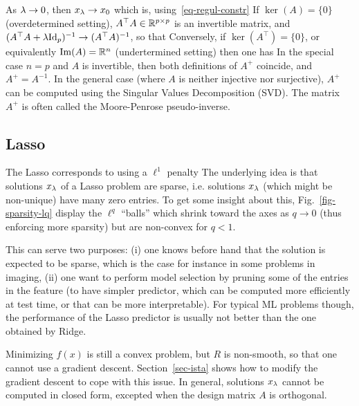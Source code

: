 As $\lambda \rightarrow 0$, then $x_\lambda \rightarrow x_0$ which is, using~\eqref{eq-regul-constr}
If $\ker(A)=\{0\}$ (overdetermined setting), $A^\top A \in \mathbb{R}^{p \times p}$ is an invertible matrix, and $(A^\top A + \lambda \mathrm{Id}_p)^{-1} \rightarrow (A^\top A)^{-1}$, so that 
Conversely, if $\ker(A^\top)=\{0\}$, or equivalently $\operatorname{Im}(A)=\mathbb{R}^n$ (undertermined setting) then one has 
In the special case $n=p$ and $A$ is invertible, then both definitions of $A^+$ coincide, and $A^+=A^{-1}$. In the general case (where $A$ is neither injective nor surjective), $A^+$ can be computed using the Singular Values Decomposition (SVD). The matrix $A^+$ is often called the Moore-Penrose pseudo-inverse.



\subsection{Lasso}

The Lasso corresponds to using a $\ell^1$ penalty 
The underlying idea is that solutions $x_\lambda$ of a Lasso problem
are sparse, i.e. solutions $x_\lambda$ (which might be non-unique) have many zero entries. 
%
To get some insight about this, Fig.~\ref{fig-sparsity-lq} display the $\ell^q$ ``balls'' which shrink toward the axes as $q \rightarrow 0$ (thus enforcing more sparsity) but are non-convex for $q<1$.


This can serve two purposes: (i) one knows before hand that the solution is expected to be sparse, which is the case for instance in some problems in imaging, (ii) one want to perform model selection by pruning some of the entries in the feature (to have simpler predictor, which can be computed more efficiently at test time, or that can be more interpretable).
%
For typical ML problems though, the performance of the Lasso predictor is usually not better than the one obtained by Ridge.

Minimizing $f(x)$ is still a convex problem, but $R$ is non-smooth, so that one cannot use a gradient descent. 
%
Section~\ref{sec-ista} shows how to modify the gradient descent to cope with this issue. 
%
In general, solutions $x_\lambda$ cannot be computed in closed form, excepted when the design matrix $A$ is orthogonal.



